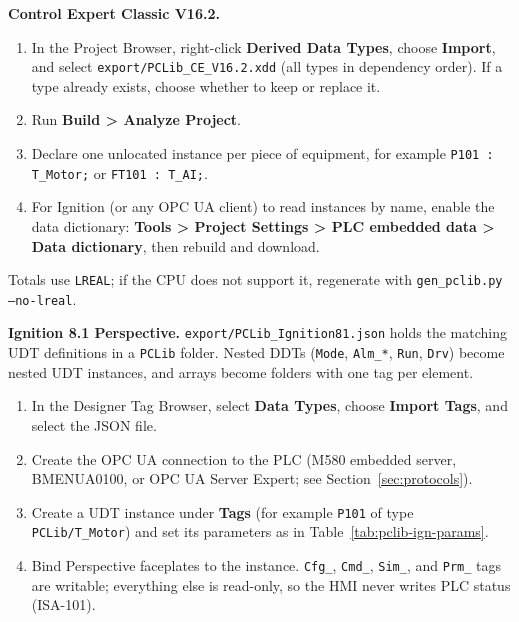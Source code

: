 \textbf{Control Expert Classic V16.2.}
\begin{enumerate}[itemsep=1pt]
  \item In the Project Browser, right-click \textbf{Derived Data Types}, choose \textbf{Import}, and select \texttt{export/PCLib\_CE\_V16.2.xdd} (all types in dependency order). If a type already exists, choose whether to keep or replace it.
  \item Run \textbf{Build \textgreater{} Analyze Project}.
  \item Declare one unlocated instance per piece of equipment, for example \texttt{P101 : T\_Motor;} or \texttt{FT101 : T\_AI;}.
  \item For Ignition (or any OPC UA client) to read instances by name, enable the data dictionary: \textbf{Tools \textgreater{} Project Settings \textgreater{} PLC embedded data \textgreater{} Data dictionary}, then rebuild and download.
\end{enumerate}
Totals use \texttt{LREAL}; if the CPU does not support it, regenerate with \texttt{gen\_pclib.py --no-lreal}.

\textbf{Ignition 8.1 Perspective.} \texttt{export/PCLib\_Ignition81.json} holds the matching UDT definitions in a \texttt{PCLib} folder. Nested DDTs (\texttt{Mode}, \texttt{Alm\_*}, \texttt{Run}, \texttt{Drv}) become nested UDT instances, and arrays become folders with one tag per element.
\begin{enumerate}[itemsep=1pt]
  \item In the Designer Tag Browser, select \textbf{Data Types}, choose \textbf{Import Tags}, and select the JSON file.
  \item Create the OPC UA connection to the PLC (M580 embedded server, BMENUA0100, or OPC UA Server Expert; see Section~\ref{sec:protocols}).
  \item Create a UDT instance under \textbf{Tags} (for example \texttt{P101} of type \texttt{PCLib/T\_Motor}) and set its parameters as in Table~\ref{tab:pclib-ign-params}.
  \item Bind Perspective faceplates to the instance. \texttt{Cfg\_}, \texttt{Cmd\_}, \texttt{Sim\_}, and \texttt{Prm\_} tags are writable; everything else is read-only, so the HMI never writes PLC status (ISA-101).
\end{enumerate}


